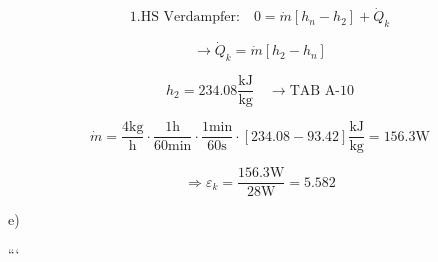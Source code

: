 \[
1. \text{HS Verdampfer:} \quad 0 = \dot{m} [h_n - h_2] + \dot{Q}_k
\]

\[
\rightarrow \dot{Q}_k = \dot{m} [h_2 - h_n]
\]

\[
h_2 = 234.08 \frac{\text{kJ}}{\text{kg}} \quad \rightarrow \text{TAB A-10}
\]

\[
\dot{m} = \frac{4 \text{kg}}{\text{h}} \cdot \frac{1 \text{h}}{60 \text{min}} \cdot \frac{1 \text{min}}{60 \text{s}} \cdot [234.08 - 93.42] \frac{\text{kJ}}{\text{kg}} = 156.3 \text{W}
\]

\[
\Rightarrow \varepsilon_k = \frac{156.3 \text{W}}{28 \text{W}} = 5.582
\]

e) \quad {}

```